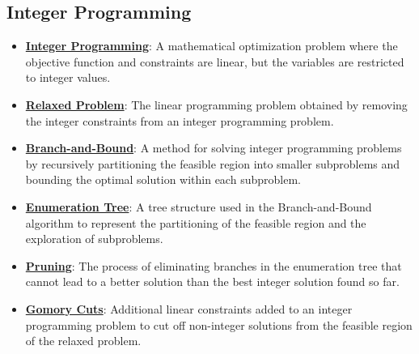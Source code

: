 \documentclass{article}%
\begin{document}
%
\subsection{Integer Programming}%
\label{subsec:IntegerProgramming}%
\begin{itemize}[leftmargin=*]%
\item \href{https://www.math.purdue.edu/~yipn/421/2024-10-31-IntLinProg.pdf#page=1}{\textbf{Integer Programming}}: A mathematical optimization problem where the objective function and constraints are linear, but the variables are restricted to integer values.%
\item \href{https://www.math.purdue.edu/~yipn/421/2024-10-31-IntLinProg.pdf#page=2}{\textbf{Relaxed Problem}}: The linear programming problem obtained by removing the integer constraints from an integer programming problem.%
\item \href{https://www.math.purdue.edu/~yipn/421/2024-10-31-IntLinProg.pdf#page=5}{\textbf{Branch-and-Bound}}: A method for solving integer programming problems by recursively partitioning the feasible region into smaller subproblems and bounding the optimal solution within each subproblem.%
\item \href{https://www.math.purdue.edu/~yipn/421/2024-10-31-IntLinProg.pdf#page=6}{\textbf{Enumeration Tree}}: A tree structure used in the Branch-and-Bound algorithm to represent the partitioning of the feasible region and the exploration of subproblems.%
\item \href{https://www.math.purdue.edu/~yipn/421/2024-10-31-IntLinProg.pdf#page=11}{\textbf{Pruning}}: The process of eliminating branches in the enumeration tree that cannot lead to a better solution than the best integer solution found so far.%
\item \href{https://www.math.purdue.edu/~yipn/421/2024-10-31-IntLinProg.pdf#page=15}{\textbf{Gomory Cuts}}: Additional linear constraints added to an integer programming problem to cut off non-integer solutions from the feasible region of the relaxed problem.%
\end{itemize}

%
\end{document}
